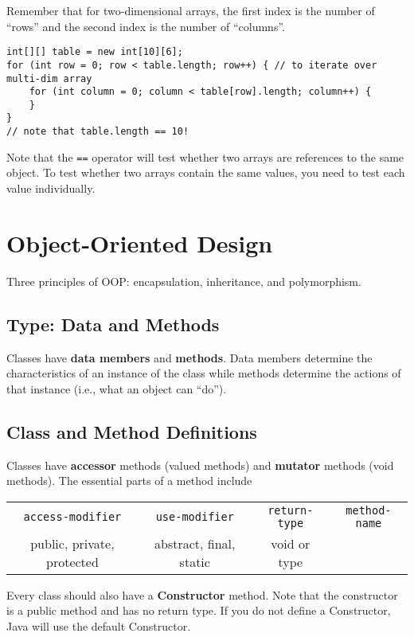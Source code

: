 \documentclass{article}
\begin{document}
\begin{flushleft}
Remember that for two-dimensional arrays, the first index is the number of ``rows'' and the second index is the number of ``columns''.

\begin{verbatim}
int[][] table = new int[10][6];
for (int row = 0; row < table.length; row++) { // to iterate over multi-dim array
    for (int column = 0; column < table[row].length; column++) {
    }
}
// note that table.length == 10!
\end{verbatim}

Note that the \texttt{==} operator will test whether two arrays are references to the same object. To test whether two arrays contain the same values, you need to test each value individually.


\section{Object-Oriented Design}

Three principles of OOP: encapsulation, inheritance, and polymorphism.

\subsection{Type: Data and Methods}

Classes have \textbf{data members} and \textbf{methods}. Data members determine the characteristics of an instance of the class while methods determine the actions of that instance (i.e., what an object can ``do'').

\subsection{Class and Method Definitions}

Classes have \textbf{accessor} methods (valued methods) and \textbf{mutator} methods (void methods). The essential parts of a method include

\begin{center}
\begin{tabular}{cccc}
\texttt{access-modifier} & \texttt{use-modifier} & \texttt{return-type} & \texttt{method-name} \\
\footnotesize public, private, protected & \footnotesize abstract, final, static & \footnotesize void or type & 
\end{tabular}
\end{center}

Every class should also have a \textbf{Constructor} method. Note that the constructor is a public method and has no return type. If you do not define a Constructor, Java will use the default Constructor.


\end{flushleft}
\end{document}
